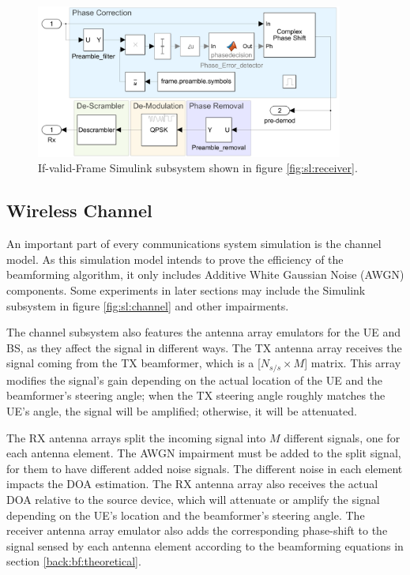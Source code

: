 \documentclass[12pt,a4paper]{report}
\begin{document}
\begin{figure}[!]
    \centering
    \includegraphics[width = 0.9\textwidth]{Figures/SL_if_valid.png}
    \caption[Simulink subsystem for the valid frame.]{If-valid-Frame Simulink subsystem shown in figure \ref{fig:sl:receiver}.}
    \label{fig:sl:receiver:if_valid}
\end{figure}

\newpage
\subsection{Wireless Channel} \label{met:sim:chan}
An important part of every communications system simulation is the channel model. As this simulation model intends to prove the efficiency of the beamforming algorithm, it only includes Additive White Gaussian Noise (AWGN) components. Some experiments in later sections may include the Simulink subsystem in figure \ref{fig:sl:channel} and other impairments.

The channel subsystem also features the antenna array emulators for the UE and BS, as they affect the signal in different ways. The TX antenna array receives the signal coming from the TX beamformer, which is a [$N_{s/s} \times M$] matrix. This array modifies the signal's gain depending on the actual location of the UE and the beamformer's steering angle; when the TX steering angle roughly matches the UE's angle, the signal will be amplified; otherwise, it will be attenuated.

The RX antenna arrays split the incoming signal into $M$ different signals, one for each antenna element. The AWGN impairment must be added to the split signal, for them to have different added noise signals. The different noise in each element impacts the DOA estimation. The RX antenna array also receives the actual DOA relative to the source device, which will attenuate or amplify the signal depending on the UE's location and the beamformer's steering angle. The receiver antenna array emulator also adds the corresponding phase-shift to the signal sensed by each antenna element according to the beamforming equations in section \ref{back:bf:theoretical}.
\end{document}
